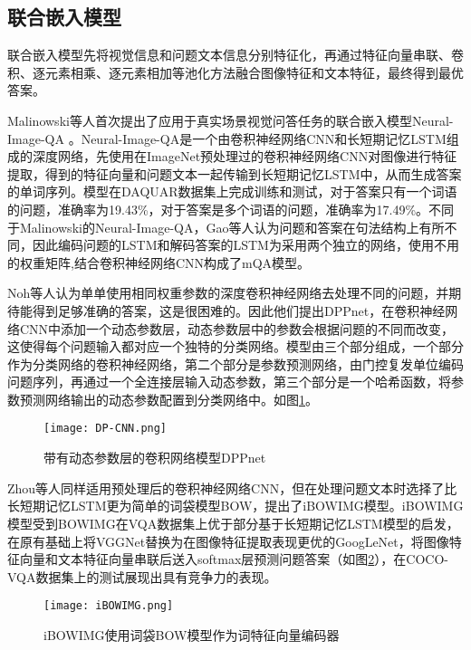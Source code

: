 \subsection{联合嵌入模型}
联合嵌入模型先将视觉信息和问题文本信息分别特征化，再通过特征向量串联、卷积、逐元素相乘、逐元素相加等池化方法融合图像特征和文本特征，最终得到最优答案。

Malinowski等人首次提出了应用于真实场景视觉问答任务的联合嵌入模型Neural-Image-QA
。Neural-Image-QA是一个由卷积神经网络CNN和长短期记忆LSTM组成的深度网络，先使用在ImageNet预处理过的卷积神经网络CNN对图像进行特征提取，得到的特征向量和问题文本一起传输到长短期记忆LSTM中，从而生成答案的单词序列。模型在DAQUAR数据集上完成训练和测试，对于答案只有一个词语的问题，准确率为19.43\%，对于答案是多个词语的问题，准确率为17.49\%。不同于Malinowski的Neural-Image-QA，Gao等人认为问题和答案在句法结构上有所不同，因此编码问题的LSTM和解码答案的LSTM为采用两个独立的网络，使用不用的权重矩阵,结合卷积神经网络CNN构成了mQA模型。

Noh等人认为单单使用相同权重参数的深度卷积神经网络去处理不同的问题，并期待能得到足够准确的答案，这是很困难的。因此他们提出DPPnet，在卷积神经网络CNN中添加一个动态参数层，动态参数层中的参数会根据问题的不同而改变，这使得每个问题输入都对应一个独特的分类网络。模型由三个部分组成，一个部分作为分类网络的卷积神经网络，第二个部分是参数预测网络，由门控复发单位编码问题序列，再通过一个全连接层输入动态参数，第三个部分是一个哈希函数，将参数预测网络输出的动态参数配置到分类网络中。如图\ref{DP-CNN}。
\begin{figure}[H]
	\centering
	\texttt{[image: DP-CNN.png]}
	\caption{带有动态参数层的卷积网络模型DPPnet}
	\label{DP-CNN}
\end{figure}

Zhou等人同样适用预处理后的卷积神经网络CNN，但在处理问题文本时选择了比长短期记忆LSTM更为简单的词袋模型BOW，提出了iBOWIMG模型。iBOWIMG模型受到BOWIMG在VQA数据集上优于部分基于长短期记忆LSTM模型的启发，在原有基础上将VGGNet替换为在图像特征提取表现更优的GoogLeNet，将图像特征向量和文本特征向量串联后送入softmax层预测问题答案（如图\ref{iBOWIMG}），在COCO-VQA数据集上的测试展现出具有竞争力的表现。
\begin{figure}[H]
	\centering
	\texttt{[image: iBOWIMG.png]}
	\caption{iBOWIMG使用词袋BOW模型作为词特征向量编码器}
	\label{iBOWIMG}
\end{figure}

